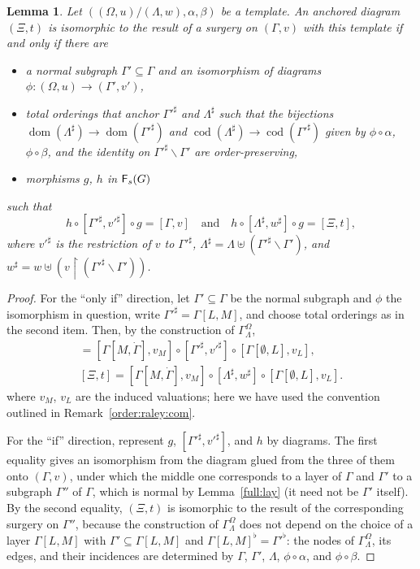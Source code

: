 \documentclass[12pt]{amsart}
\theoremstyle{plain}
\newtheorem{lem}[thm]{Lemma}
\theoremstyle{definition}
\theoremstyle{remark}
\numberwithin{equation}{section}
\theoremstyle{plain}
\DeclareMathOperator{\dom}{dom}
\DeclareMathOperator{\cod}{cod}
\newcommand{\0}{\emptyset}
\newcommand{\rest}{\upharpoonright}
\newcommand{\fun}{\longrightarrow}
\newcommand{\sub}{\subseteq}
\newcommand{\mi}{\smallsetminus}
\newcommand{\dand}{\quad \text{and} \quad}
\newcommand{\cat}[1]{\textup{\textsf{#1}}}
\begin{document}
\begin{lem}\label{sur:decom}
Let $((\Omega, u) / (\Lambda, w), \alpha, \beta)$ be a template. An anchored diagram $(\Xi, t)$ is isomorphic to the result of a surgery on $(\Gamma, v)$ with this template if and only if there are
\begin{itemize}
  \item a normal subgraph $\Gamma' \sub \Gamma$ and an isomorphism of diagrams $\phi : (\Omega, u) \fun (\Gamma', v')$,
  \item total orderings that anchor $\Gamma'^{\sharp}$ and $\Lambda^{\sharp}$ such that the bijections $\dom(\Lambda^{\sharp}) \fun \dom(\Gamma'^{\sharp})$ and $\cod(\Lambda^{\sharp}) \fun \cod(\Gamma'^{\sharp})$ given by $\phi \circ \alpha$, $\phi \circ \beta$, and the identity on $\Gamma'^{\sharp} \mi \Gamma'$ are order-preserving,
  \item morphisms $g$, $h$ in $\cat F_s(G)$
\end{itemize}
such that
\[
h \circ [\Gamma'^{\sharp}, v'^{\sharp}] \circ g = [\Gamma, v] \dand h \circ [\Lambda^{\sharp}, w^{\sharp}] \circ g = [\Xi, t],
\]
where $v'^{\sharp}$ is the restriction of $v$ to $\Gamma'^{\sharp}$, $\Lambda^{\sharp} = \Lambda \uplus (\Gamma'^{\sharp} \mi \Gamma')$,  and  $w^{\sharp} = w \uplus (v \rest (\Gamma'^{\sharp} \mi \Gamma'))$.
\end{lem}
\begin{proof}
For the ``only if'' direction, let $\Gamma' \sub \Gamma$ be the normal subgraph and $\phi$ the isomorphism in question, write $\Gamma'^{\sharp} = \Gamma[L, M]$, and choose total orderings as in the second item. Then, by the construction of $\Gamma^\Omega_\Lambda$,
\begin{gather*}
[\Gamma, v] = [\Gamma[M, \dot \Gamma], v_M] \circ [\Gamma'^{\sharp}, v'^{\sharp}] \circ [\Gamma[\0, L], v_L],\\
[\Xi, t] = [\Gamma[M, \dot \Gamma], v_M] \circ [\Lambda^{\sharp}, w^{\sharp}] \circ [\Gamma[\0, L], v_L].
\end{gather*}
where $v_M$, $v_L$ are the induced valuations; here we have used the convention outlined in Remark~\ref{order:raley:com}.

For the ``if'' direction, represent $g$, $[\Gamma'^{\sharp}, v'^{\sharp}]$, and $h$ by diagrams. The first equality gives an isomorphism from the diagram glued from the three of them onto $(\Gamma, v)$, under which the middle one corresponds to a layer of $\Gamma$ and $\Gamma'$ to a subgraph $\Gamma''$ of $\Gamma$, which is normal by Lemma~\ref{full:lay} (it need not be $\Gamma'$ itself). By the second equality, $(\Xi, t)$ is isomorphic to the result of the corresponding surgery on $\Gamma''$, because the construction of $\Gamma^\Omega_\Lambda$ does not depend on the choice of a layer $\Gamma[L, M]$ with $\Gamma' \sub \Gamma[L, M]$ and $\Gamma[L, M]^\flat = \Gamma'^{\flat}$: the nodes of $\Gamma^\Omega_\Lambda$, its edges, and their incidences are determined by $\Gamma$, $\Gamma'$, $\Lambda$, $\phi \circ \alpha$, and $\phi \circ \beta$.
\end{proof}
\end{document}
